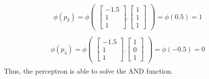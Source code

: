 \begin{align}
  \nonumber
  \begin{matrix}
    \phi(p_3) = \phi\begin{pmatrix}
      \begin{bmatrix}
        -1.5 \\
        1 \\
        1 
      \end{bmatrix}.\begin{bmatrix}
        1 \\
        1 \\
        1
      \end{bmatrix}
    \end{pmatrix} = \phi(0.5) = 1
  \end{matrix}
\end{align}
\begin{align}
  \nonumber
  \begin{matrix}
    \phi(p_4) = \phi\begin{pmatrix}
      \begin{bmatrix}
        -1.5 \\
        1 \\
        1 
      \end{bmatrix}.\begin{bmatrix}
        1 \\
        0 \\
        1
      \end{bmatrix}
    \end{pmatrix} = \phi(-0.5) = 0
  \end{matrix}
\end{align}
Thus, the perceptron is able to solve the AND function.
